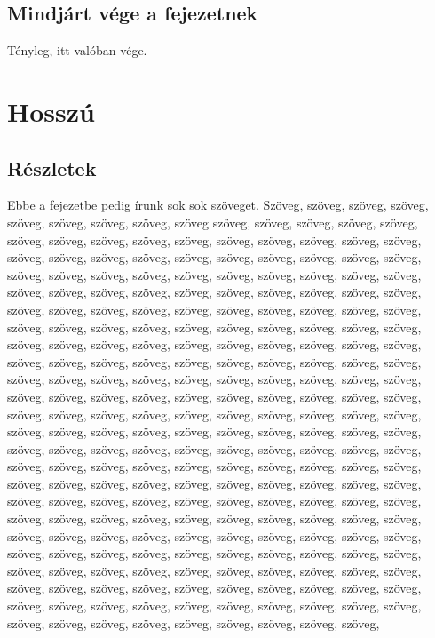 \documentclass[12pt]{report}
\theoremstyle{definition}
\begin{document}
\section{Mindjárt vége a fejezetnek}
Tényleg, itt valóban vége.


\chapter{Hosszú}
\section{Részletek}
Ebbe a fejezetbe pedig írunk sok sok szöveget. Szöveg, szöveg, szöveg,  szöveg, szöveg, szöveg,   szöveg, szöveg, szöveg
szöveg, szöveg, szöveg,  szöveg, szöveg, szöveg, szöveg, szöveg, szöveg, szöveg, szöveg, szöveg, szöveg, szöveg, szöveg,
szöveg, szöveg, szöveg, szöveg, szöveg, szöveg, szöveg, szöveg, szöveg, szöveg, szöveg, szöveg, szöveg, szöveg, szöveg,
szöveg, szöveg, szöveg, szöveg, szöveg, szöveg, szöveg, szöveg, szöveg, szöveg, szöveg, szöveg,
szöveg, szöveg, szöveg, szöveg, szöveg, szöveg, szöveg, szöveg, szöveg, szöveg, szöveg, szöveg, szöveg, szöveg, szöveg,
szöveg, szöveg, szöveg, szöveg, szöveg, szöveg, szöveg, szöveg, szöveg, szöveg, szöveg, szöveg, szöveg, szöveg, szöveg,
szöveg, szöveg, szöveg, szöveg, szöveg, szöveg, szöveg, szöveg, szöveg, szöveg, szöveg, szöveg, szöveg, szöveg, szöveg,
szöveg, szöveg, szöveg, szöveg, szöveg, szöveg, szöveg, szöveg, szöveg, szöveg, szöveg, szöveg, szöveg, szöveg, szöveg,
szöveg, szöveg, szöveg, szöveg, szöveg, szöveg, szöveg, szöveg, szöveg, szöveg, szöveg, szöveg, szöveg, szöveg, szöveg,
szöveg, szöveg, szöveg, szöveg, szöveg, szöveg, szöveg, szöveg, szöveg, szöveg, szöveg, szöveg, szöveg, szöveg, szöveg,
szöveg, szöveg, szöveg, szöveg, szöveg, szöveg, szöveg, szöveg, szöveg, szöveg, szöveg, szöveg, szöveg, szöveg, szöveg,
szöveg, szöveg, szöveg,  szöveg, szöveg, szöveg, szöveg, szöveg, szöveg, szöveg, szöveg, szöveg, szöveg, szöveg, szöveg,
szöveg, szöveg, szöveg, szöveg, szöveg, szöveg, szöveg, szöveg, szöveg, szöveg, szöveg, szöveg, szöveg, szöveg, szöveg,
szöveg, szöveg, szöveg, szöveg, szöveg, szöveg, szöveg, szöveg, szöveg, szöveg, szöveg, szöveg,
szöveg, szöveg, szöveg, szöveg, szöveg, szöveg, szöveg, szöveg, szöveg, szöveg, szöveg, szöveg, szöveg, szöveg, szöveg,
szöveg, szöveg, szöveg, szöveg, szöveg, szöveg, szöveg, szöveg, szöveg, szöveg, szöveg, szöveg, szöveg, szöveg, szöveg,
szöveg, szöveg, szöveg, szöveg, szöveg, szöveg, szöveg, szöveg, szöveg, szöveg, szöveg, szöveg, szöveg, szöveg, szöveg,
\end{document}
